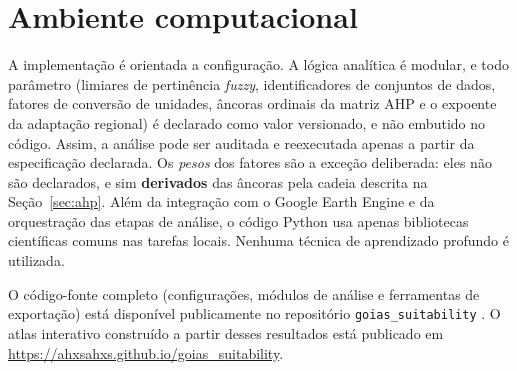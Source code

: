\section{Ambiente computacional}

A implementação é orientada a configuração. A lógica analítica é modular, e todo parâmetro (limiares de
pertinência \emph{fuzzy}, identificadores de conjuntos de dados, fatores de conversão de unidades, âncoras
ordinais da matriz AHP e o expoente da adaptação regional) é declarado como valor versionado, e não
embutido no código. Assim, a análise pode ser auditada e reexecutada apenas a partir da especificação
declarada. Os \emph{pesos} dos fatores são a exceção deliberada: eles não são declarados, e sim
\textbf{derivados} das âncoras pela cadeia descrita na Seção~\ref{sec:ahp}. Além da integração com o
Google Earth Engine e da orquestração das etapas de análise, o código Python usa apenas bibliotecas
científicas comuns nas tarefas locais. Nenhuma técnica de aprendizado profundo é utilizada.

O código-fonte completo (configurações, módulos de análise e ferramentas de exportação) está disponível
publicamente no repositório \texttt{goias\_suitability} \citep{da_silva_goias_suitability_2026}. O atlas
interativo construído a partir desses resultados está publicado em
\url{https://ahxsahxs.github.io/goias_suitability}.
